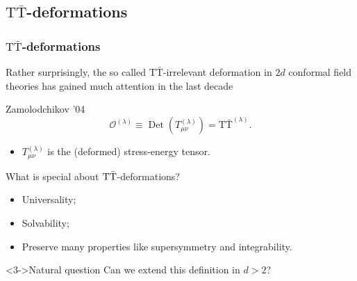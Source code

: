 \documentclass{beamer}
\DeclareMathOperator{\Det}{Det}
\begin{document}
\subsection{$\textrm{T}\bar{\textrm{T}}$-deformations}

\begin{frame}
    \frametitle{$\mathrm{T}\bar{\mathrm{T}}$-deformations}


    
    Rather surprisingly, the so called $\textrm{T}\bar{\textrm{T}}$-irrelevant deformation in $2d$ conformal field theories has gained much attention in the last decade

    \begin{block}{Zamolodchikov '04}
        \[\mathcal{O}^{(\lambda)}\equiv \Det(T_{\mu\nu}^{(\lambda)})=\textrm{T}\bar{\textrm{T}}^{(\lambda)}.\]
    \end{block}

    \begin{itemize}
        \item $T_{\mu\nu}^{(\lambda)}$ is the (deformed) stress-energy tensor.
    \end{itemize}
    
    What is special about $\rm{T}\bar{T}$-deformations?   

    \begin{itemize}[<+->]
        \item Universality;
        \item Solvability;
        \item Preserve many properties like supersymmetry and integrability.
    \end{itemize}

    \begin{block}<3->{Natural question}
        Can we extend this definition in $d>2$?
    \end{block}


\end{frame}
\end{document}
